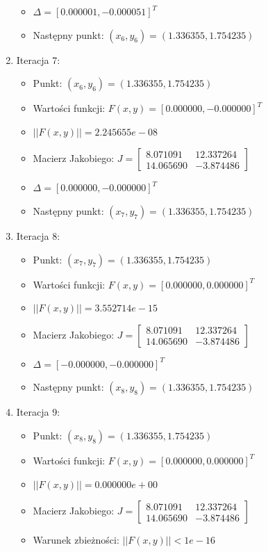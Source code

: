 \documentclass[a4paper,12pt]{article}
\begin{document}
\begin{enumerate}
\begin{itemize}
        \item $\Delta = [0.000001, -0.000051]^T$
        \item Następny punkt: $(x_6, y_6) = (1.336355, 1.754235)$
      \end{itemize}
    \item Iteracja 7:
      \begin{itemize}
        \item Punkt: $(x_6, y_6) = (1.336355, 1.754235)$
        \item Wartości funkcji: $F(x,y) = [0.000000, -0.000000]^T$
        \item $||F(x,y)|| = 2.245655e-08$
        \item Macierz Jakobiego: $J = \begin{bmatrix} 8.071091 & 12.337264 \\ 14.065690 & -3.874486 \end{bmatrix}$
        \item $\Delta = [0.000000, -0.000000]^T$
        \item Następny punkt: $(x_7, y_7) = (1.336355, 1.754235)$
      \end{itemize}
    \item Iteracja 8:
      \begin{itemize}
        \item Punkt: $(x_7, y_7) = (1.336355, 1.754235)$
        \item Wartości funkcji: $F(x,y) = [0.000000, 0.000000]^T$
        \item $||F(x,y)|| = 3.552714e-15$
        \item Macierz Jakobiego: $J = \begin{bmatrix} 8.071091 & 12.337264 \\ 14.065690 & -3.874486 \end{bmatrix}$
        \item $\Delta = [-0.000000, -0.000000]^T$
        \item Następny punkt: $(x_8, y_8) = (1.336355, 1.754235)$
      \end{itemize}
    \item Iteracja 9:
      \begin{itemize}
        \item Punkt: $(x_8, y_8) = (1.336355, 1.754235)$
        \item Wartości funkcji: $F(x,y) = [0.000000, 0.000000]^T$
        \item $||F(x,y)|| = 0.000000e+00$
        \item Macierz Jakobiego: $J = \begin{bmatrix} 8.071091 & 12.337264 \\ 14.065690 & -3.874486 \end{bmatrix}$
        \item Warunek zbieżności: $||F(x,y)|| < 1e-16$
      \end{itemize}
    \end{enumerate}
     
\end{document}
